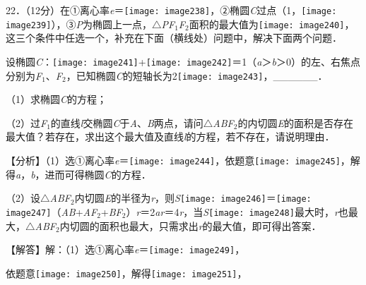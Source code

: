 \documentclass[a4paper,11pt,UTF8,twoside]{ctexart} %
\begin{document}
22．（12分）在①离心率\textit{e}＝\texttt{[image: image238]}，②椭圆\textit{C}过点（1，\texttt{[image: image239]}），③\textit{P}为椭圆上一点，$\mathrm{\triangle}$\textit{PF}${}_{1}$\textit{F}${}_{2}$面积的最大值为\texttt{[image: image240]}，这三个条件中任选一个，补充在下面（横线处）问题中，解决下面两个问题．

设椭圆\textit{C}：\texttt{[image: image241]}+\texttt{[image: image242]}＝1（\textit{a}＞\textit{b}＞0）的左、右焦点分别为\textit{F}${}_{1}$、\textit{F}${}_{2}$，已知椭圆\textit{C}的短轴长为2\texttt{[image: image243]}，\_\_\_\_\_\_．

（1）求椭圆\textit{C}的方程；

（2）过\textit{F}${}_{1}$的直线\textit{l}交椭圆\textit{C}于\textit{A}、\textit{B}两点，请问$\mathrm{\triangle}$\textit{ABF}${}_{2}$的内切圆\textit{E}的面积是否存在最大值？若存在，求出这个最大值及直线\textit{l}的方程，若不存在，请说明理由．

【分析】（1）选①离心率\textit{e}＝\texttt{[image: image244]}，依题意\texttt{[image: image245]}，解得\textit{a}，\textit{b}，进而可得椭圆\textit{C}的方程．

（2）设$\mathrm{\triangle}$\textit{ABF}${}_{2}$内切圆\textit{E}的半径为\textit{r}，则\textit{S}\texttt{[image: image246]}＝\texttt{[image: image247]}（{\textbar}\textit{AB}{\textbar}+{\textbar}\textit{AF}${}_{2}${\textbar}+{\textbar}\textit{BF}${}_{2}${\textbar}）\textit{r}＝2\textit{ar}＝4\textit{r}，当\textit{S}\texttt{[image: image248]}最大时，\textit{r}也最大，$\mathrm{\triangle}$\textit{ABF}${}_{2}$内切圆的面积也最大，只需求出\textit{r}的最大值，即可得出答案．

【解答】解：（1）选①离心率\textit{e}＝\texttt{[image: image249]}，

依题意\texttt{[image: image250]}，解得\texttt{[image: image251]}，
\end{document}

